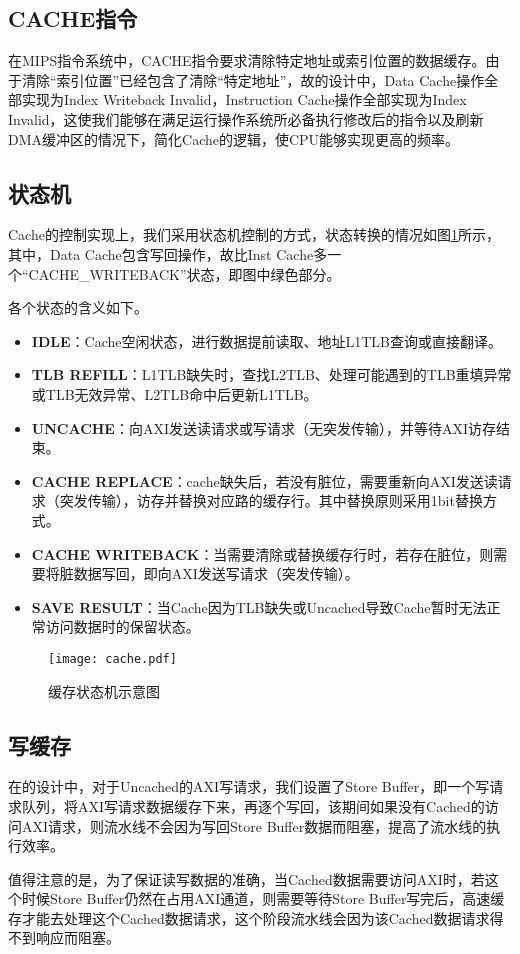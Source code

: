 \subsection{CACHE指令}
在MIPS指令系统中，CACHE指令要求清除特定地址或索引位置的数据缓存。由于清除“索引位置”已经包含了清除“特定地址”，故\cpuname 的设计中，Data Cache操作全部实现为Index Writeback Invalid，Instruction Cache操作全部实现为Index Invalid，这使我们能够在满足运行操作系统所必备执行修改后的指令以及刷新DMA缓冲区的情况下，简化Cache的逻辑，使CPU能够实现更高的频率。

\subsection{状态机}
Cache的控制实现上，我们采用状态机控制的方式，状态转换的情况如图\ref{img:cache}所示，其中，Data Cache包含写回操作，故比Inst Cache多一个“CACHE\_WRITEBACK”状态，即图中绿色部分。

各个状态的含义如下。
\begin{itemize}
    \item \textbf{IDLE}：Cache空闲状态，进行数据提前读取、地址L1TLB查询或直接翻译。
    \item \textbf{TLB REFILL}：L1TLB缺失时，查找L2TLB、处理可能遇到的TLB重填异常或TLB无效异常、L2TLB命中后更新L1TLB。
    \item \textbf{UNCACHE}：向AXI发送读请求或写请求（无突发传输），并等待AXI访存结束。
    \item \textbf{CACHE REPLACE}：cache缺失后，若没有脏位，需要重新向AXI发送读请求（突发传输），访存并替换对应路的缓存行。其中替换原则采用1bit替换方式。
    \item \textbf{CACHE WRITEBACK}：当需要清除或替换缓存行时，若存在脏位，则需要将脏数据写回，即向AXI发送写请求（突发传输）。
    \item \textbf{SAVE RESULT}：当Cache因为TLB缺失或Uncached导致Cache暂时无法正常访问数据时的保留状态。
\end{itemize}

\begin{figure}[htpb]
    \centering
    \texttt{[image: cache.pdf]}
    \caption{\cpuname 缓存状态机示意图}
    \label{img:cache}
\end{figure}

\subsection{写缓存}
在\cpuname 的设计中，对于Uncached的AXI写请求，我们设置了Store Buffer，即一个写请求队列，将AXI写请求数据缓存下来，再逐个写回，该期间如果没有Cached的访问AXI请求，则流水线不会因为写回Store Buffer数据而阻塞，提高了流水线的执行效率。

值得注意的是，为了保证读写数据的准确，当Cached数据需要访问AXI时，若这个时候Store Buffer仍然在占用AXI通道，则需要等待Store Buffer写完后，高速缓存才能去处理这个Cached数据请求，这个阶段流水线会因为该Cached数据请求得不到响应而阻塞。
